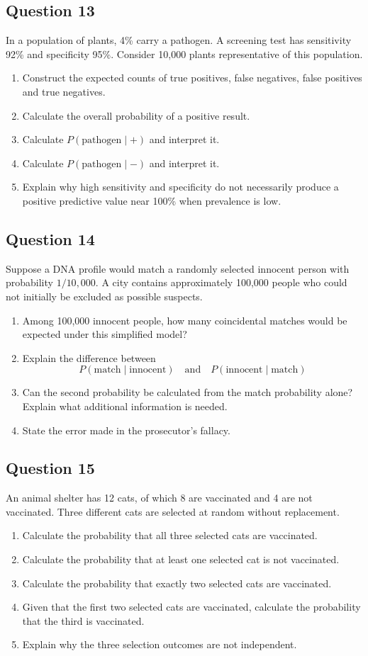 \documentclass[10pt,letterpaper]{article}
\newcommand{\questionheading}[1]{%
  \subsection*{Question #1}
}
\begin{document}
\questionheading{13}
In a population of plants, 4\% carry a pathogen. A screening test has sensitivity 92\% and specificity 95\%. Consider 10,000 plants representative of this population.
\begin{enumerate}
	\item Construct the expected counts of true positives, false negatives, false positives and true negatives.
	\item Calculate the overall probability of a positive result.
	\item Calculate $P(\text{pathogen}\mid +)$ and interpret it.
	\item Calculate $P(\text{pathogen}\mid -)$ and interpret it.
	\item Explain why high sensitivity and specificity do not necessarily produce a positive predictive value near 100\% when prevalence is low.
\end{enumerate}

\questionheading{14}
Suppose a DNA profile would match a randomly selected innocent person with probability $1/10{,}000$. A city contains approximately 100,000 people who could not initially be excluded as possible suspects.
\begin{enumerate}
	\item Among 100,000 innocent people, how many coincidental matches would be expected under this simplified model?	
	\item Explain the difference between
	\[
	P(\text{match}\mid\text{innocent}) \quad\text{and}\quad P(\text{innocent}\mid\text{match})
	\]
	\item Can the second probability be calculated from the match probability alone? Explain what additional information is needed.
	\item State the error made in the prosecutor's fallacy.
\end{enumerate}

\questionheading{15}
An animal shelter has 12 cats, of which 8 are vaccinated and 4 are not vaccinated. Three different cats are selected at random without replacement.
\begin{enumerate}
	\item Calculate the probability that all three selected cats are vaccinated.
	\item Calculate the probability that at least one selected cat is not vaccinated.
	 \item Calculate the probability that exactly two selected cats are vaccinated.
	\item Given that the first two selected cats are vaccinated, calculate the probability that the third is vaccinated.
	\item Explain why the three selection outcomes are not independent.
\end{enumerate}
\end{document}
